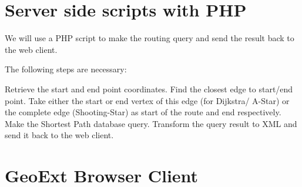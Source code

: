 \documentclass[a4paper,10pt,english]{manual}
\begin{document}
\resetcurrentobjects
\hypertarget{--doc-chapters/php_server}{}

\chapter{Server side scripts with PHP}

We will use a PHP script to make the routing query and send the result back to the web client.

The following steps are necessary:

Retrieve the start and end point coordinates.
Find the closest edge to start/end point.
Take either the start or end vertex of this edge (for Dijkstra/ A-Star) or the complete edge (Shooting-Star) as start of the route and end respectively.
Make the Shortest Path database query.
Transform the query result to XML and send it back to the web client.

\resetcurrentobjects
\hypertarget{--doc-chapters/geoext_client}{}

\chapter{GeoExt Browser Client}


\renewcommand{\indexname}{Module Index}

\renewcommand{\indexname}{Index}
\printindex
\end{document}
